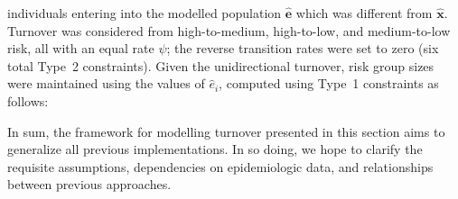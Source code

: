 individuals entering into the modelled population $\bm{\hat{e}}$
which was different from $\bm{\hat{x}}$.
Turnover was considered from
high-to-medium, high-to-low, and medium-to-low risk,
all with an equal rate $\psi$;
the reverse transition rates were set to zero
(six total Type~2 constraints).
Given the unidirectional turnover,
risk group sizes were maintained using the values of $\hat{e}_i$,
computed using Type~1 constraints as follows:

\par
In sum, the framework for modelling turnover presented in this section
aims to generalize all previous implementations.
In so doing, we hope to clarify the requisite assumptions,
dependencies on epidemiologic data,
and relationships between previous approaches.
